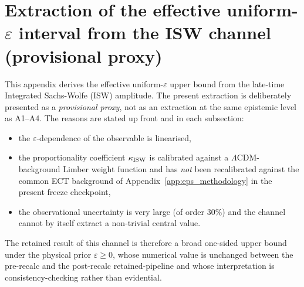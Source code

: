 %
%
%
%

\section{Extraction of the effective uniform-$\varepsilon$ interval
from the ISW channel (provisional proxy)}
\label{app:eps_extraction_isw}

This appendix derives the effective uniform-$\varepsilon$ upper
bound from the late-time Integrated Sachs-Wolfe (ISW) amplitude.
The present extraction is deliberately presented as a
\emph{provisional proxy}, not as an extraction at the same
epistemic level as A1--A4. The reasons are stated up front and in
each subsection:
\begin{itemize}
  \item the $\varepsilon$-dependence of the observable is
        linearised,
  \item the proportionality coefficient $\kappa_{\rm ISW}$ is
        calibrated against a $\Lambda$CDM-background Limber
        weight function and has \emph{not} been recalibrated
        against the common ECT background of
        Appendix~\ref{app:eps_methodology} in the present
        freeze checkpoint,
  \item the observational uncertainty is very large (of order
        $30\%$) and the channel cannot by itself extract a
        non-trivial central value.
\end{itemize}
The retained result of this channel is therefore a broad
one-sided upper bound under the physical prior
$\varepsilon \geq 0$, whose numerical value is unchanged between
the pre-recalc and the post-recalc retained-pipeline and whose
interpretation is consistency-checking rather than evidential.

